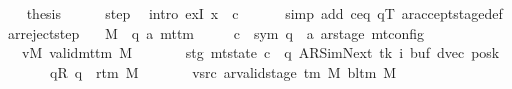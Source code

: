 \begin{isabellebody}
\ \ \isamarkupfalse%
\ {\isacharquery}{\kern0pt}thesis\isanewline
\ \ \ \ \isamarkupfalse%
\ step\ \isamarkupfalse%
\ {\isacharparenleft}{\kern0pt}intro\ exI{\isacharbrackleft}{\kern0pt}\ x\ {\isacharequal}{\kern0pt}\ {\isacharquery}{\kern0pt}c{\isacharprime}{\kern0pt}{\isacharprime}{\kern0pt}{\isacharbrackright}{\kern0pt}{\isacharparenright}{\kern0pt}\isanewline
\ \ \ \ \ \ {\isacharparenleft}{\kern0pt}simp\ add{\isacharcolon}{\kern0pt}\ c{\isacharprime}{\kern0pt}{\isacharunderscore}{\kern0pt}eq\ qT\ ar{\isacharunderscore}{\kern0pt}accept{\isacharunderscore}{\kern0pt}stage{\isacharunderscore}{\kern0pt}def{\isacharparenright}{\kern0pt}\isanewline
{}\isamarkupfalse%
%
\endisatagproof
{\isafoldproof}%
%
\isadelimproof
\isanewline
%
\endisadelimproof
\isanewline
{}\isamarkupfalse%
\ ar{\isacharunderscore}{\kern0pt}reject{\isacharunderscore}{\kern0pt}step{\isacharcolon}{\kern0pt}\isanewline
\ \ \ M\ {\isacharcolon}{\kern0pt}{\isacharcolon}{\kern0pt}\ {\isachardoublequoteopen}{\isacharparenleft}{\kern0pt}{\isacharprime}{\kern0pt}q{\isacharcomma}{\kern0pt}\ {\isacharprime}{\kern0pt}a{\isacharparenright}{\kern0pt}\ mttm{\isachardoublequoteclose}\isanewline
\ \ \ \ \ c{\isacharprime}{\kern0pt}\ {\isacharcolon}{\kern0pt}{\isacharcolon}{\kern0pt}\ {\isachardoublequoteopen}{\isacharparenleft}{\kern0pt}sym{}{\isacharcomma}{\kern0pt}\ {\isacharprime}{\kern0pt}q\ {\isasymtimes}\ {\isacharprime}{\kern0pt}a\ ar{\isacharunderscore}{\kern0pt}stage{\isacharparenright}{\kern0pt}\ mt{\isacharunderscore}{\kern0pt}config{\isachardoublequoteclose}\isanewline
\ \ \ vM{\isacharcolon}{\kern0pt}\ {\isachardoublequoteopen}valid{\isacharunderscore}{\kern0pt}mttm\ M{\isachardoublequoteclose}\isanewline
\ \ \ \ \ \ \ stg{\isacharcolon}{\kern0pt}\ {\isachardoublequoteopen}mt{\isacharunderscore}{\kern0pt}state\ c{\isacharprime}{\kern0pt}\ {\isacharequal}{\kern0pt}\ {\isacharparenleft}{\kern0pt}q{\isacharcomma}{\kern0pt}\ AR{\isacharunderscore}{\kern0pt}SimNext{\isacharcomma}{\kern0pt}\ tk{\isacharcomma}{\kern0pt}\ i{\isacharcomma}{\kern0pt}\ buf{\isacharcomma}{\kern0pt}\ dvec{\isacharcomma}{\kern0pt}\ posk{\isacharparenright}{\kern0pt}{\isachardoublequoteclose}\isanewline
\ \ \ \ \ \ \ qR{\isacharcolon}{\kern0pt}\ {\isachardoublequoteopen}q\ {\isacharequal}{\kern0pt}\ r{\isacharunderscore}{\kern0pt}tm\ M{\isachardoublequoteclose}\isanewline
\ \ \ \ \ \ \ vsrc{\isacharcolon}{\kern0pt}\ {\isachardoublequoteopen}ar{\isacharunderscore}{\kern0pt}valid{\isacharunderscore}{\kern0pt}stage\ {\isacharparenleft}{\kern0pt}{\isasymGamma}{\isacharunderscore}{\kern0pt}tm\ M{\isacharparenright}{\kern0pt}\ {\isacharparenleft}{\kern0pt}bl{\isacharunderscore}{\kern0pt}tm\ M{\isacharparenright}{\kern0pt}\isanewline

\end{isabellebody}
